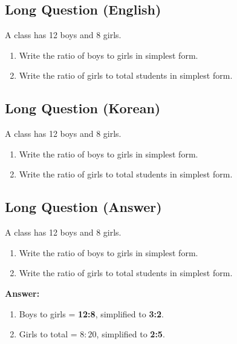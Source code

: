 \cleardoublepage
\subsection*{Long Question (English)}
A class has 12 boys and 8 girls.
\begin{enumerate}[label=\alph*)]
  \item Write the ratio of boys to girls in simplest form.
  \item Write the ratio of girls to total students in simplest form.
\end{enumerate}


\newpage
\subsection*{Long Question (Korean)}
A class has 12 boys and 8 girls.
\begin{enumerate}[label=\alph*)]
  \item Write the ratio of boys to girls in simplest form.
  \item Write the ratio of girls to total students in simplest form.
\end{enumerate}


\newpage
\subsection*{Long Question (Answer)}
A class has 12 boys and 8 girls.
\begin{enumerate}[label=\alph*)]
  \item Write the ratio of boys to girls in simplest form.
  \item Write the ratio of girls to total students in simplest form.
\end{enumerate}

\textbf{Answer:}
\begin{enumerate}[label=\alph*)]
  \item Boys to girls = \textbf{12:8}, simplified to \textbf{3:2}.
  \item Girls to total = $8:20$, simplified to \textbf{2:5}.
\end{enumerate}
